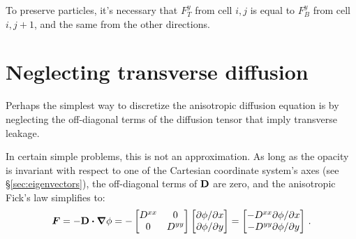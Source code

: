 To preserve particles, it's necessary that $F_T^y$ from cell $i,j$ is equal to
$F_B^y$ from cell $i,{j+1}$, and the same from the other directions.

\section{Neglecting transverse diffusion}\label{sec:discreteDiag}

Perhaps the simplest way to discretize the anisotropic diffusion equation is by
neglecting the off-diagonal terms of the diffusion tensor that imply transverse
leakage.

In certain simple problems, this is not an approximation. As long as the
opacity is invariant with respect to one of the Cartesian coordinate system's
axes (see \S\ref{sec:eigenvectors}), the off-diagonal terms of $\mathbf{D}$ are
zero, and the anisotropic Fick's law simplifies to:
\begin{equation*}
  \bm{F} = - \mathbf{D} \bm{\cdot} \bm{\nabla} \phi
  = -
  \begin{bmatrix}
    D^{xx} & 0 \\
    0 & D^{yy}
  \end{bmatrix}
  \begin{bmatrix}
    {\partial \phi}/{\partial x} \\
    {\partial \phi}/{\partial y}
  \end{bmatrix}
  = 
  \begin{bmatrix}
    - D^{xx} {\partial \phi}/{\partial x} \\
    - D^{yy} {\partial \phi}/{\partial y}
  \end{bmatrix}
  \,.
\end{equation*}


